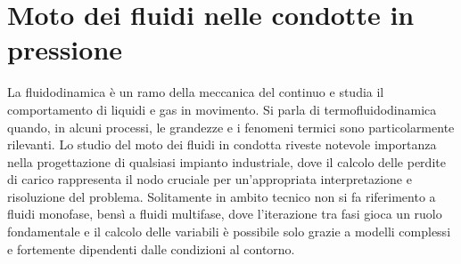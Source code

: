 \clearpage{\pagestyle{empty}\cleardoublepage}
\chapter{Moto dei fluidi nelle condotte in pressione}\label{ch:fluidodinamica}
La fluidodinamica è un ramo della meccanica del continuo e studia il comportamento di liquidi e gas in movimento. Si parla di termofluidodinamica quando, in alcuni processi, le grandezze e i fenomeni termici sono particolarmente rilevanti. Lo studio del moto dei fluidi in condotta riveste notevole importanza nella progettazione di qualsiasi impianto industriale, dove il calcolo delle perdite di carico rappresenta il nodo cruciale per un'appropriata interpretazione e risoluzione del problema. Solitamente in ambito tecnico non si fa riferimento a fluidi monofase, bensì a fluidi multifase, dove l'iterazione tra fasi gioca un ruolo fondamentale e il calcolo delle variabili è possibile solo grazie a modelli complessi e fortemente dipendenti dalle condizioni al contorno. 
